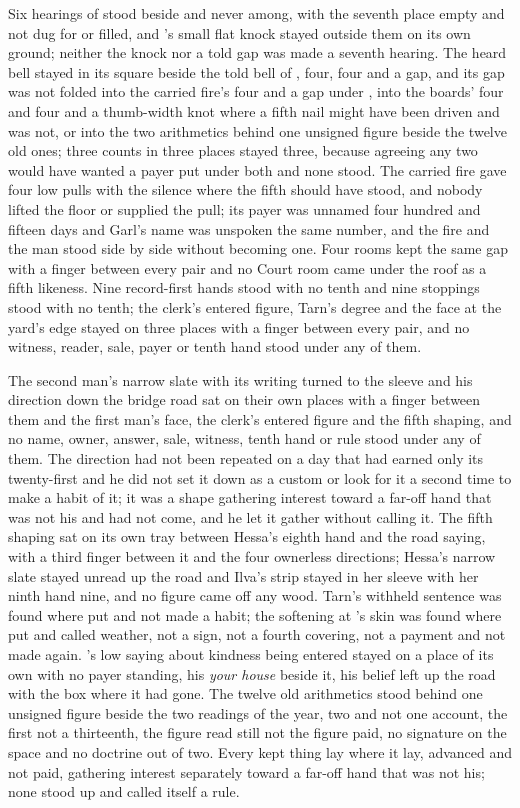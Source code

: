 Six hearings of  stood beside and never among, with the seventh place empty and not dug for or filled, and 's small flat knock stayed outside them on its own ground; neither the knock nor a told gap was made a seventh hearing. The heard bell stayed in its square beside the told bell of , four, four and a gap, and its gap was not folded into the carried fire's four and a gap under , into the boards' four and four and a thumb-width knot where a fifth nail might have been driven and was not, or into the two arithmetics behind one unsigned figure beside the twelve old ones; three counts in three places stayed three, because agreeing any two would have wanted a payer put under both and none stood. The carried fire gave four low pulls with the silence where the fifth should have stood, and nobody lifted the floor or supplied the pull; its payer was unnamed four hundred and fifteen days and Garl's name was unspoken the same number, and the fire and the man stood side by side without becoming one. Four rooms kept the same gap with a finger between every pair and no Court room came under the roof as a fifth likeness. Nine record-first hands stood with no tenth and nine stoppings stood with no tenth; the clerk's entered figure, Tarn's degree and the face at the yard's edge stayed on three places with a finger between every pair, and no witness, reader, sale, payer or tenth hand stood under any of them.

The second man's narrow slate with its writing turned to the sleeve and his direction down the bridge road sat on their own places with a finger between them and the first man's face, the clerk's entered figure and the fifth shaping, and no name, owner, answer, sale, witness, tenth hand or rule stood under any of them. The direction had not been repeated on a day that had earned only its twenty-first and he did not set it down as a custom or look for it a second time to make a habit of it; it was a shape gathering interest toward a far-off hand that was not his and had not come, and he let it gather without calling it. The fifth shaping sat on its own tray between Hessa's eighth hand and the road saying, with a third finger between it and the four ownerless directions; Hessa's narrow slate stayed unread up the road and Ilva's strip stayed in her sleeve with her ninth hand nine, and no figure came off any wood. Tarn's withheld sentence was found where put and not made a habit; the softening at 's skin was found where put and called weather, not a sign, not a fourth covering, not a payment and not made again. 's low saying about kindness being entered stayed on a place of its own with no payer standing, his \emph{your house} beside it, his belief left up the road with the box where it had gone. The twelve old arithmetics stood behind one unsigned figure beside the two readings of the year, two and not one account, the first not a thirteenth, the figure read still not the figure paid, no signature on the space and no doctrine out of two. Every kept thing lay where it lay, advanced and not paid, gathering interest separately toward a far-off hand that was not his; none stood up and called itself a rule.

